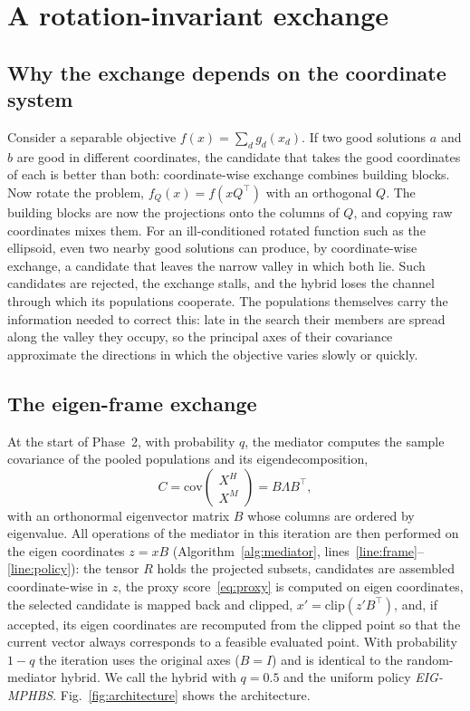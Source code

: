 \section{A rotation-invariant exchange}
\label{sec:eigen}

\subsection{Why the exchange depends on the coordinate system}
Consider a separable objective $f(x)=\sum_d g_d(x_d)$. If two good solutions $a$ and $b$ are good in different coordinates,
the candidate that takes the good coordinates of each is better than both: coordinate-wise exchange combines building
blocks. Now rotate the problem, $f_Q(x)=f(xQ^\top)$ with an orthogonal $Q$. The building blocks are now the projections onto
the columns of $Q$, and copying raw coordinates mixes them. For an ill-conditioned rotated function such as the ellipsoid,
even two nearby good solutions can produce, by coordinate-wise exchange, a candidate that leaves the narrow valley in which
both lie. Such candidates are rejected, the exchange stalls, and the hybrid loses the channel through which its populations
cooperate. The populations themselves carry the information needed to correct this: late in the search their members are
spread along the valley they occupy, so the principal axes of their covariance approximate the directions in which the
objective varies slowly or quickly.

\subsection{The eigen-frame exchange}
At the start of Phase~2, with probability $q$, the mediator computes the sample covariance of the pooled populations and its
eigendecomposition,
\begin{equation}
C = \mathrm{cov}\!\begin{pmatrix} X^H \\ X^M \end{pmatrix} = B\Lambda B^\top,
\label{eq:cov}
\end{equation}
with an orthonormal eigenvector matrix $B$ whose columns are ordered by eigenvalue. All operations of the mediator in this
iteration are then performed on the eigen coordinates $z=xB$ (Algorithm~\ref{alg:mediator}, lines~\ref{line:frame}--\ref{line:policy}):
the tensor $R$ holds the projected subsets, candidates are assembled coordinate-wise in $z$, the proxy
score~\eqref{eq:proxy} is computed on eigen coordinates, the selected candidate is mapped back and clipped,
$x'=\mathrm{clip}(z'B^\top)$, and, if accepted, its eigen coordinates are recomputed from the clipped point so that the
current vector always corresponds to a feasible evaluated point. With probability $1-q$ the iteration uses the original axes
($B=I$) and is identical to the random-mediator hybrid. We call the hybrid with $q=0.5$ and the uniform policy
\emph{EIG-MPHBS}. Fig.~\ref{fig:architecture} shows the architecture.

